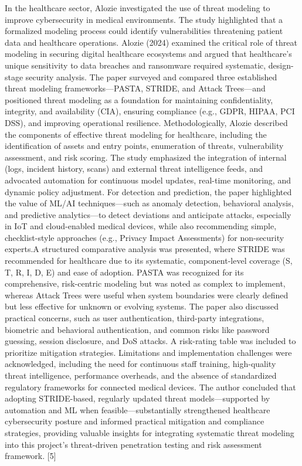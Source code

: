 \documentclass[12pt,a4paper]{report}
\begin{document}
In the healthcare sector, Alozie investigated the use of threat modeling to improve cybersecurity in medical environments. The study highlighted that a formalized modeling process could identify vulnerabilities threatening patient data and healthcare operations. Alozie (2024) examined the critical role of threat modeling in securing digital healthcare ecosystems and argued that healthcare’s unique sensitivity to data breaches and ransomware required systematic, design-stage security analysis. The paper surveyed and compared three established threat modeling frameworks—PASTA, STRIDE, and Attack Trees—and positioned threat modeling as a foundation for maintaining confidentiality, integrity, and availability (CIA), ensuring compliance (e.g., GDPR, HIPAA, PCI DSS), and improving operational resilience. Methodologically, Alozie described the components of effective threat modeling for healthcare, including the identification of assets and entry points, enumeration of threats, vulnerability assessment, and risk scoring. The study emphasized the integration of internal (logs, incident history, scans) and external threat intelligence feeds, and advocated automation for continuous model updates, real-time monitoring, and dynamic policy adjustment. For detection and prediction, the paper highlighted the value of ML/AI techniques—such as anomaly detection, behavioral analysis, and predictive analytics—to detect deviations and anticipate attacks, especially in IoT and cloud-enabled medical devices, while also recommending simple, checklist-style approaches (e.g., Privacy Impact Assessments) for non-security experts.A structured comparative analysis was presented, where STRIDE was recommended for healthcare due to its systematic, component-level coverage (S, T, R, I, D, E) and ease of adoption. PASTA was recognized for its comprehensive, risk-centric modeling but was noted as complex to implement, whereas Attack Trees were useful when system boundaries were clearly defined but less effective for unknown or evolving systems. The paper also discussed practical concerns, such as user authentication, third-party integrations, biometric and behavioral authentication, and common risks like password guessing, session disclosure, and DoS attacks. A risk-rating table was included to prioritize mitigation strategies. Limitations and implementation challenges were acknowledged, including the need for continuous staff training, high-quality threat intelligence, performance overheads, and the absence of standardized regulatory frameworks for connected medical devices. The author concluded that adopting STRIDE-based, regularly updated threat models—supported by automation and ML when feasible—substantially strengthened healthcare cybersecurity posture and informed practical mitigation and compliance strategies, providing valuable insights for integrating systematic threat modeling into this project’s threat-driven penetration testing and risk assessment framework. [5]
\end{document}
